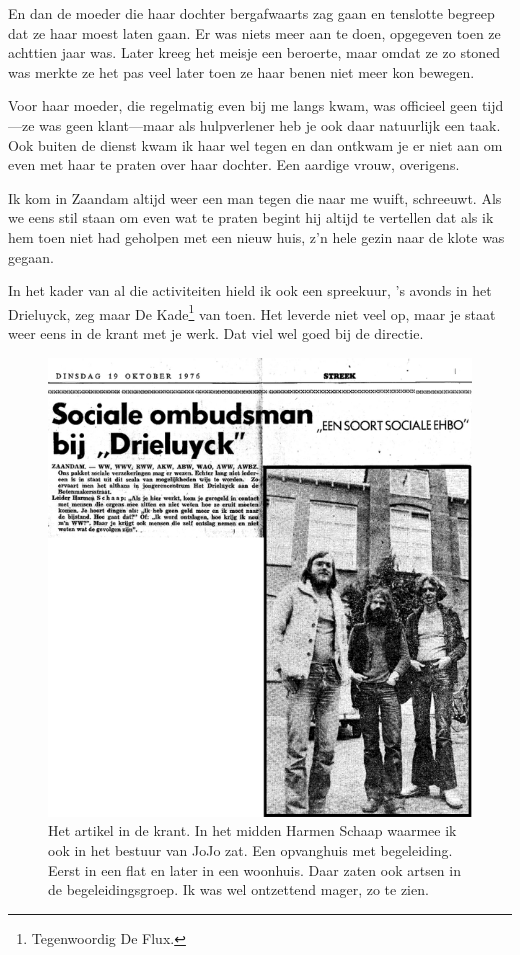 \documentclass[10pt,twoside, openright]{memoir}
\begin{document}
En dan de moeder die haar dochter bergafwaarts zag gaan en tenslotte begreep dat ze haar moest laten gaan. Er was niets meer aan te doen, opgegeven toen ze achttien jaar was. Later kreeg het meisje een beroerte, maar omdat ze zo stoned was merkte ze het pas veel later toen ze haar benen niet meer kon bewegen. 

Voor haar moeder, die regelmatig even bij me langs kwam, was officieel geen tijd---ze was geen klant---maar als hulpverlener heb je ook daar natuurlijk een taak. Ook buiten de dienst kwam ik haar wel tegen en dan ontkwam je er niet aan om even met haar te praten over haar dochter. Een aardige vrouw, overigens.

Ik kom in Zaandam altijd weer een man tegen die naar me wuift, schreeuwt. Als we eens stil staan om even wat te praten begint hij altijd te vertellen dat als ik hem toen niet had geholpen met een nieuw huis, z’n hele gezin naar de klote was gegaan.

In het kader van al die activiteiten hield ik ook een spreekuur, 's avonds in het Drieluyck, zeg maar De Kade\footnote{Tegenwoordig De Flux.} van toen. Het leverde niet veel op, maar je staat weer eens in de krant met je werk. Dat viel wel goed bij de directie. 

\begin{figure}
\includegraphics[width=\textwidth]{img/ch42/krant}
\caption*{\footnotesize Het artikel in de krant. In het midden Harmen Schaap waarmee ik ook in het bestuur van JoJo zat. Een opvanghuis met begeleiding. Eerst in een flat en later in een woonhuis. Daar zaten ook artsen in de begeleidingsgroep. Ik was wel ontzettend mager, zo te zien.}
\end{figure}
\end{document}
